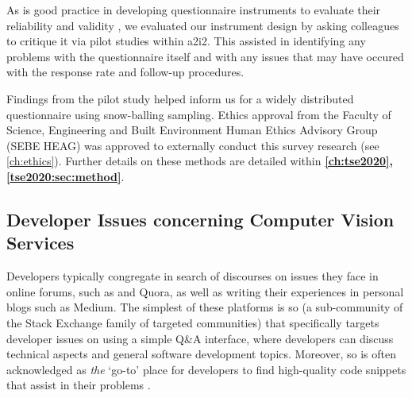 As is good practice in developing questionnaire instruments to evaluate their reliability and validity \citep{Litwin:1995wt}, we evaluated our instrument design by asking colleagues to critique it via pilot studies within \gls{a2i2}. This assisted in identifying any problems with the questionnaire itself and with any issues that may have occured with the response rate and follow-up procedures.

Findings from the pilot study helped inform us for a widely distributed questionnaire using snow-balling sampling. Ethics approval from the Faculty of Science, Engineering and Built Environment Human Ethics Advisory Group (SEBE HEAG) was approved to externally conduct this survey research (see \cref{ch:ethics}). 
Further details on these methods are detailed within \textbf{\cref{ch:tse2020}, \cref{tse2020:sec:method}}.

\subsection{Developer Issues concerning Computer Vision Services}

Developers typically congregate in search of discourses on issues they face in online forums, such as  and Quora, as well as writing their experiences in personal blogs such as Medium. The simplest of these platforms is \gls{so} (a sub-community of the Stack Exchange family of targeted communities) that specifically targets developer issues on using a simple Q\&A interface, where developers can discuss technical aspects and general software development topics. Moreover, \gls{so} is often acknowledged as \textit{the} `go-to' place for developers to find high-quality code snippets that assist in their problems \citep{Subramanian:2014bg}.

